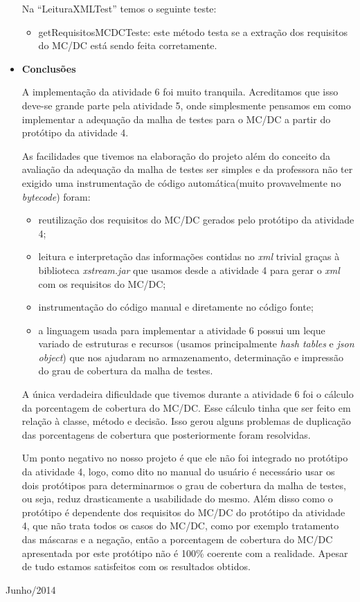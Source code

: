 \documentclass[a4paper,11pt]{article}
\newcommand{\sepitem}{\vspace{0.1in}\item}
\begin{document}
\begin{itemize}
Na ``LeituraXMLTest'' temos o seguinte teste:
\begin{itemize}
\item getRequisitosMCDCTeste: este método testa se a extração dos requisitos do MC/DC está sendo feita corretamente. 
\end{itemize}

\sepitem \textbf{Conclusões}
\setlength{\parindent}{5ex}

A implementação da atividade 6 foi muito tranquila. Acreditamos que isso deve-se grande parte pela atividade 5, onde 
simplesmente pensamos em como implementar a adequação da malha de testes para o MC/DC a partir do protótipo da atividade 4.

As facilidades que tivemos na elaboração do projeto além do conceito da avaliação da adequação da malha de testes
ser simples e da professora não ter exigido uma instrumentação de código automática(muito provavelmente no \textit{bytecode})
foram:

\begin{itemize}
\item reutilização dos requisitos do MC/DC gerados pelo protótipo da atividade 4;
\item leitura e interpretação das informações contidas no \textit{xml} trivial graças à biblioteca \textit{xstream.jar} que usamos 
desde a atividade 4 para gerar o \textit{xml} com os requisitos do MC/DC;
\item instrumentação do código manual e diretamente no código fonte;
\item a linguagem usada para implementar a atividade 6 possui um leque variado de estruturas e recursos (usamos principalmente 
\textit{hash tables} e  \textit{json object}) que nos ajudaram no armazenamento, determinação e impressão do grau de cobertura da malha 
de testes.
\end{itemize}

A única verdadeira dificuldade que tivemos durante a atividade 6 foi o cálculo da porcentagem de cobertura do MC/DC. Esse cálculo 
tinha que ser feito em relação à classe, método e decisão. Isso gerou alguns problemas de duplicação das porcentagens de cobertura
que posteriormente foram resolvidas.

Um ponto negativo no nosso projeto é que ele não foi integrado no protótipo da atividade 4, logo, como dito no manual do usuário 
é necessário usar os dois protótipos para determinarmos o grau de cobertura da malha de testes, ou seja, reduz drasticamente a
usabilidade do mesmo. Além disso como o protótipo é dependente dos requisitos do MC/DC do protótipo da atividade 4, que não trata 
todos os casos do MC/DC, como por exemplo tratamento das máscaras e a negação, então a porcentagem de cobertura do MC/DC apresentada 
por este protótipo não é 100\% coerente com a realidade. Apesar de tudo estamos satisfeitos com os resultados obtidos. 

\end{itemize}

\vfill

\raggedleft
{\sc Junho/2014}
\end{document}
